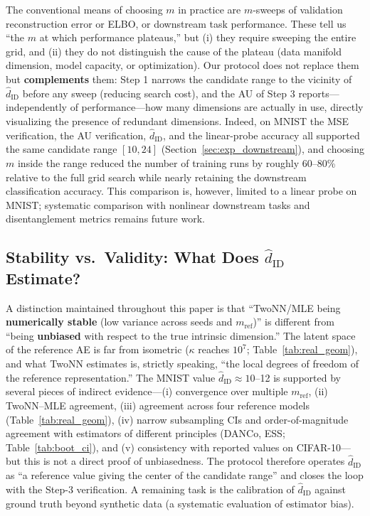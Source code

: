\documentclass[make,article,submit,pdftex,moreauthors]{Definitions/mdpi}
\newcommand{\hatdID}{\hat{d}_{\mathrm{ID}}}
\newcommand{\kap}{\kappa}
\begin{document}
The conventional means of choosing $m$ in practice are $m$-sweeps of
validation reconstruction error or ELBO, or downstream task performance.
These tell us ``the $m$ at which performance plateaus,'' but
(i) they require sweeping the entire grid, and
(ii) they do not distinguish the cause of the plateau (data manifold
dimension, model capacity, or optimization).
Our protocol does not replace them but \textbf{complements} them:
Step 1 narrows the candidate range to the vicinity of $\hatdID$ before any
sweep (reducing search cost), and the AU of Step 3 reports---independently
of performance---how many dimensions are actually in use, directly
visualizing the presence of redundant dimensions.
Indeed, on MNIST the MSE verification, the AU verification, $\hatdID$, and
the linear-probe accuracy all supported the same candidate range $[10, 24]$
(Section~\ref{sec:exp_downstream}), and choosing $m$ inside the range
reduced the number of training runs by roughly 60--80\% relative to the
full grid search while nearly retaining the downstream classification
accuracy.
This comparison is, however, limited to a linear probe on MNIST; systematic
comparison with nonlinear downstream tasks and disentanglement metrics
remains future work.

\subsection{Stability vs.\ Validity: What Does $\hatdID$ Estimate?}\label{sec:disc_twonn}

A distinction maintained throughout this paper is that
``TwoNN/MLE being \textbf{numerically stable} (low variance across seeds and
$m_{\mathrm{ref}}$)'' is different from ``being \textbf{unbiased} with
respect to the true intrinsic dimension.''
The latent space of the reference AE is far from isometric ($\kap$ reaches
$10^{7}$; Table~\ref{tab:real_geom}), and what TwoNN estimates is, strictly
speaking, ``the local degrees of freedom of the reference representation.''
The MNIST value $\hatdID \approx 10$--12 is supported by several pieces of
indirect evidence---(i) convergence over multiple $m_{\mathrm{ref}}$,
(ii) TwoNN--MLE agreement, (iii) agreement across four reference models
(Table~\ref{tab:real_geom}), (iv) narrow subsampling CIs and
order-of-magnitude agreement with estimators of different principles
(DANCo, ESS; Table~\ref{tab:boot_ci}), and (v) consistency with reported
values on CIFAR-10---but this is not a direct proof of unbiasedness.
The protocol therefore operates $\hatdID$ as ``a reference value giving the
center of the candidate range'' and closes the loop with the Step-3
verification.
A remaining task is the calibration of $\hatdID$ against ground truth beyond
synthetic data (a systematic evaluation of estimator bias).
\end{document}
